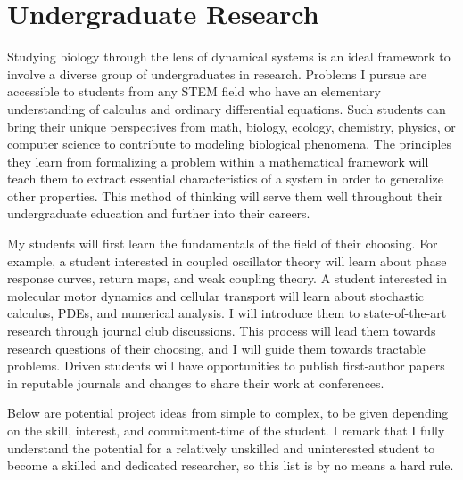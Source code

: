 \documentclass[a4paper,11pt]{article}
\begin{document}
	\section{Undergraduate Research}\label{sec:undergrad}
	
	Studying biology through the lens of dynamical systems is an ideal framework to involve a diverse group of undergraduates in research. Problems I pursue are accessible to students from any STEM field who have an elementary understanding of calculus and ordinary differential equations. Such students can bring their unique perspectives from math, biology, ecology, chemistry, physics, or computer science to contribute to modeling biological phenomena. The principles they learn from formalizing a problem within a mathematical framework will teach them to extract essential characteristics of a system in order to generalize other properties. This method of thinking will serve them well throughout their undergraduate education and further into their careers.
	
	My students will first learn the fundamentals of the field of their choosing. For example, a student interested in coupled oscillator theory will learn about phase response curves, return maps, and weak coupling theory. A student interested in molecular motor dynamics and cellular transport will learn about stochastic calculus, PDEs, and numerical analysis. I will introduce them to state-of-the-art research through journal club discussions. This process will lead them towards research questions of their choosing, and I will guide them towards tractable problems. Driven students will have opportunities to publish first-author papers in reputable journals and changes to share their work at conferences.
    
	Below are potential project ideas from simple to complex, to be given depending on the skill, interest, and commitment-time of the student. I remark that I fully understand the potential for a relatively unskilled and uninterested student to become a skilled and dedicated researcher, so this list is by no means a hard rule.
	
\end{document}
